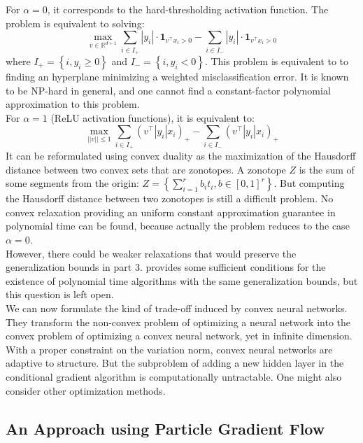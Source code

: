 \documentclass[a4paper, 11pt]{scrartcl}
\begin{document}
For $\alpha = 0$, it corresponds to the hard-thresholding activation function. The problem is equivalent to solving:
\begin{equation}
\max_{v \in \mathbb{R}^{d+1}} \sum_{i\in I_+} |y_i| \cdot \mathbf{1}_{v^\top x_i> 0}  - \sum_{i\in I_-} |y_i| \cdot \mathbf{1}_{v^\top x_i> 0}
\end{equation}
where $I_+ = \left\{i, y_i \geq 0 \right\}$ and $I_- = \left\{i, y_i < 0 \right\}$. This problem is equivalent to to finding an hyperplane minimizing a weighted misclassification error. It is known to be NP-hard in general, and one cannot find a constant-factor polynomial approximation to this problem.\\

For $\alpha = 1$ (ReLU activation functions), it is equivalent to:
\begin{equation}
\max_{||v|| \leq 1} \sum_{i\in I_+} (v^\top |y_i| x_i )_+  - \sum_{i\in I_-} (v^\top |y_i| x_i )_+
\end{equation}
It can be reformulated using convex duality as the maximization of the Hausdorff distance between two convex sets that are zonotopes. A zonotope $Z$ is the sum of some segments from the origin: $Z = \left\{ \sum_{i=1}^r b_i t_i, b \in [0, 1]^r \right\}$. But computing the Hausdorff distance between two zonotopes is still a difficult problem. No convex relaxation providing an uniform constant approximation guarantee in polynomial time can be found, because actually the problem reduces to the case $\alpha = 0$.\\

However, there could be weaker relaxations that would preserve the generalization bounds in part 3. \cite{bach2017breaking} provides some sufficient conditions for the existence of polynomial time algorithms with the same generalization bounds, but this question is left open.\\

We can now formulate the kind of trade-off induced by convex neural networks. They transform the non-convex problem of optimizing a neural network into the convex problem of optimizing a convex neural network, yet in infinite dimension. With a proper constraint on the variation norm, convex neural networks are adaptive to structure. But the subproblem of adding a new hidden layer in the conditional gradient algorithm is computationally untractable. One might also consider other optimization methods.


\subsection{An Approach using Particle Gradient Flow}
\end{document}

